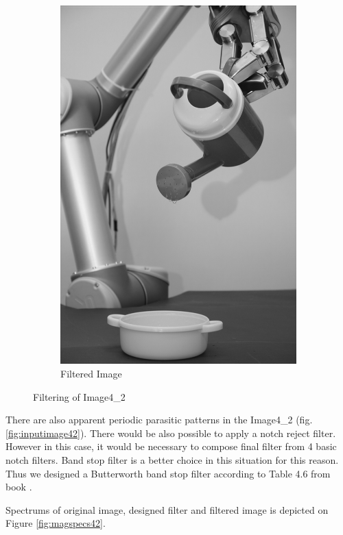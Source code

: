 \documentclass[11pt]{article}
\numberwithin{equation}{section}
\begin{document}
\begin{figure}[h]
\begin{subfigure}[b]{0.4\textwidth}
		\includegraphics[width=\textwidth]{fig/OutputImage4_2.png}
		\caption{Filtered Image}
		\label{fig:outputimage42}
	\end{subfigure}\qquad
	\caption{Filtering of Image4\_2}
\end{figure}
There are also apparent periodic parasitic patterns in the Image4\_2 (fig. \ref{fig:inputimage42}). There would be also possible to apply a notch reject filter. However in this case, it would be necessary to compose final filter from 4 basic notch filters. Band stop filter is a better choice in this situation for this reason. Thus we designed a Butterworth band stop filter according to Table 4.6 from book \cite{gonzwoods}.

Spectrums of original image, designed filter and filtered image is depicted on Figure \ref{fig:magspecs42}.
\end{document}
